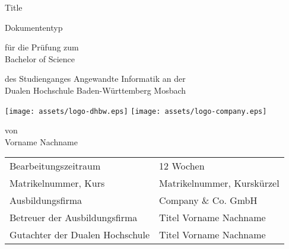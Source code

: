 \def\doctype{Dokumententyp}
\def\title{Title}
\def\author{Vorname Nachname}

\begin{titlepage}

	\vspace{10mm}

	\begin{center}
		\vspace{5mm}

		\huge \title

		\vspace{14.2pt}

		\large \doctype

		\vspace{42.6pt}

		\small für die Prüfung zum \\
		\large Bachelor of Science

		\vspace{42.6pt}

		\small des Studienganges Angewandte Informatik an der \\
		\large Dualen Hochschule Baden-Württemberg Mosbach

		\vspace{14.2pt}

		\texttt{[image: assets/logo-dhbw.eps]}
		\hspace{35pt}
		\texttt{[image: assets/logo-company.eps]}

		\vspace{42.6pt}

		\small von \\
		\large \author
	\end{center}

	\vspace{98.6pt}

	\begin{table}[h]
		\centering
		\begin{tabular}{ll}
			\small Bearbeitungszeitraum            & 12 Wochen                  \\
			\small Matrikelnummer, Kurs            & Matrikelnummer, Kurskürzel \\
			\small Ausbildungsfirma                & Company \& Co. GmbH        \\
			\small Betreuer der Ausbildungsfirma   & Titel Vorname Nachname     \\
			\small Gutachter der Dualen Hochschule & Titel Vorname Nachname     \\
		\end{tabular}
	\end{table}

	\vspace{49.7pt}


\end{titlepage}
